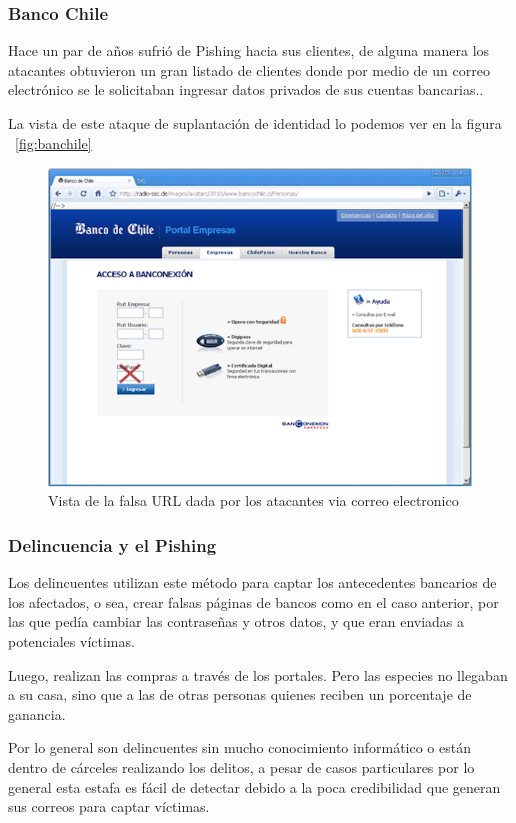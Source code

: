 \subsubsection{Banco Chile}
Hace un par de años sufrió de Pishing hacia sus clientes, de alguna manera los atacantes obtuvieron un gran listado de clientes donde por medio de un correo electrónico se le solicitaban ingresar datos privados de sus cuentas bancarias.. 

La vista de este ataque de suplantación de identidad lo podemos ver en la figura ~\ref{fig:banchile}
\begin{figure}[H]
\label{fig:banchile}
\centering
\includegraphics[width=\textwidth]{img/banco.png}
\caption{Vista de la falsa URL dada por los atacantes via correo electronico}
\label{fig:diagrama01}
\end{figure}

\subsubsection{Delincuencia y el Pishing}
Los delincuentes utilizan este método para captar los antecedentes bancarios de los afectados, o sea, crear falsas páginas de bancos como en el caso anterior, por las que pedía cambiar las contraseñas y otros datos, y que eran enviadas a potenciales víctimas.

Luego, realizan las compras a través de los portales. Pero las especies no llegaban a su casa, sino que a las de otras personas quienes reciben un porcentaje de ganancia.\cite{flaite}

Por lo general son delincuentes sin mucho conocimiento informático o están dentro de cárceles realizando los delitos, a pesar de casos particulares por lo general esta estafa es fácil de detectar debido a la poca credibilidad que generan sus correos para captar víctimas.

